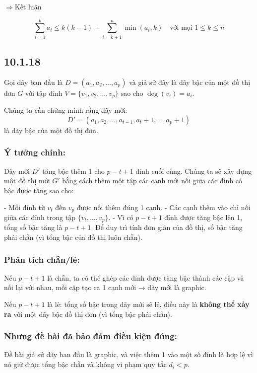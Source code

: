 \documentclass{article}
\begin{document}
	$\Rightarrow${Kết luận}
	
	\[
	\boxed{\sum_{i=1}^{k} a_i \leq k(k-1) + \sum_{i=k+1}^{n} \min(a_i, k)}
	\quad \text{với mọi } 1 \leq k \leq n
	\]
	
	\subsection*{10.1.18}
	Gọi dãy ban đầu là \( D = (a_1, a_2, \ldots, a_p) \) và giả sử đây là dãy bậc của một đồ thị đơn \( G \) với tập đỉnh \( V = \{v_1, v_2, \ldots, v_p\} \) sao cho \( \deg(v_i) = a_i \).
	
	\bigskip
	
	Chúng ta cần chứng minh rằng dãy mới:
	\[
	D' = (a_1, a_2, \ldots, a_{t-1}, a_t+1, \ldots, a_p+1)
	\]
	là dãy bậc của một đồ thị đơn.
	
	\subsubsection*{Ý tưởng chính:}
	
	Dãy mới \( D' \) tăng bậc thêm 1 cho \( p - t + 1 \) đỉnh cuối cùng. Chúng ta sẽ xây dựng một đồ thị mới \( G' \) bằng cách thêm một tập các cạnh mới nối giữa các đỉnh có bậc được tăng sao cho:
	
	- Mỗi đỉnh từ \( v_t \) đến \( v_p \) được nối thêm đúng 1 cạnh.
	- Các cạnh thêm vào chỉ nối giữa các đỉnh trong tập \( \{v_t, \ldots, v_p\} \).
	- Vì có \( p - t + 1 \) đỉnh được tăng bậc lên 1, tổng số bậc tăng là \( p - t + 1 \). Để duy trì tính đơn giản của đồ thị, số bậc tăng phải chẵn (vì tổng bậc của đồ thị luôn chẵn).
	
	\subsubsection*{Phân tích chẵn/lẻ:}
	
	Nếu \( p - t + 1 \) là chẵn, ta có thể ghép các đỉnh được tăng bậc thành các cặp và nối lại với nhau, mỗi cặp tạo ra 1 cạnh mới → dãy mới là graphic.
	
	Nếu \( p - t + 1 \) là lẻ: tổng số bậc trong dãy mới sẽ lẻ, điều này là \textbf{không thể xảy ra} với một dãy bậc đồ thị đơn (vì tổng bậc phải chẵn).
	
	\subsubsection*{Nhưng đề bài đã bảo đảm điều kiện đúng:}
	
	Đề bài giả sử dãy ban đầu là graphic, và việc thêm 1 vào một số đỉnh là hợp lệ vì nó giữ được tổng bậc chẵn và không vi phạm quy tắc \( d_i < p \).
	
\end{document}

